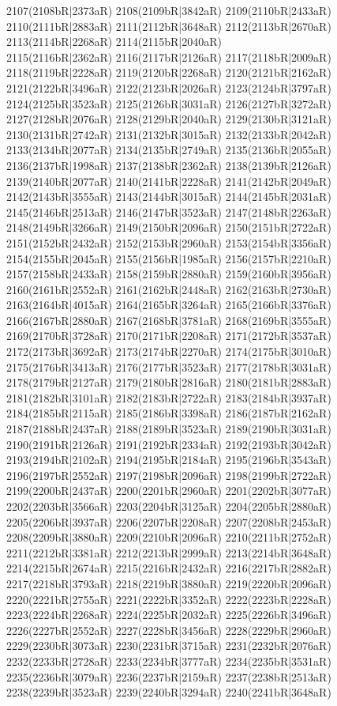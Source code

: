 2107(2108bR|2373aR) 2108(2109bR|3842aR) 2109(2110bR|2433aR) 2110(2111bR|2883aR) 2111(2112bR|3648aR) 2112(2113bR|2670aR) 2113(2114bR|2268aR) 2114(2115bR|2040aR) \\2115(2116bR|2362aR) 2116(2117bR|2126aR) 2117(2118bR|2009aR) 2118(2119bR|2228aR) 2119(2120bR|2268aR) 2120(2121bR|2162aR) 2121(2122bR|3496aR) 2122(2123bR|2026aR) 2123(2124bR|3797aR) \\2124(2125bR|3523aR) 2125(2126bR|3031aR) 2126(2127bR|3272aR) 2127(2128bR|2076aR) 2128(2129bR|2040aR) 2129(2130bR|3121aR) 2130(2131bR|2742aR) 2131(2132bR|3015aR) 2132(2133bR|2042aR) \\2133(2134bR|2077aR) 2134(2135bR|2749aR) 2135(2136bR|2055aR) 2136(2137bR|1998aR) 2137(2138bR|2362aR) 2138(2139bR|2126aR) 2139(2140bR|2077aR) 2140(2141bR|2228aR) 2141(2142bR|2049aR) \\2142(2143bR|3555aR) 2143(2144bR|3015aR) 2144(2145bR|2031aR) 2145(2146bR|2513aR) 2146(2147bR|3523aR) 2147(2148bR|2263aR) 2148(2149bR|3266aR) 2149(2150bR|2096aR) 2150(2151bR|2722aR) \\2151(2152bR|2432aR) 2152(2153bR|2960aR) 2153(2154bR|3356aR) 2154(2155bR|2045aR) 2155(2156bR|1985aR) 2156(2157bR|2210aR) 2157(2158bR|2433aR) 2158(2159bR|2880aR) 2159(2160bR|3956aR) \\2160(2161bR|2552aR) 2161(2162bR|2448aR) 2162(2163bR|2730aR) 2163(2164bR|4015aR) 2164(2165bR|3264aR) 2165(2166bR|3376aR) 2166(2167bR|2880aR) 2167(2168bR|3781aR) 2168(2169bR|3555aR) \\2169(2170bR|3728aR) 2170(2171bR|2208aR) 2171(2172bR|3537aR) 2172(2173bR|3692aR) 2173(2174bR|2270aR) 2174(2175bR|3010aR) 2175(2176bR|3413aR) 2176(2177bR|3523aR) 2177(2178bR|3031aR) \\2178(2179bR|2127aR) 2179(2180bR|2816aR) 2180(2181bR|2883aR) 2181(2182bR|3101aR) 2182(2183bR|2722aR) 2183(2184bR|3937aR) 2184(2185bR|2115aR) 2185(2186bR|3398aR) 2186(2187bR|2162aR) \\2187(2188bR|2437aR) 2188(2189bR|3523aR) 2189(2190bR|3031aR) 2190(2191bR|2126aR) 2191(2192bR|2334aR) 2192(2193bR|3042aR) 2193(2194bR|2102aR) 2194(2195bR|2184aR) 2195(2196bR|3543aR) \\2196(2197bR|2552aR) 2197(2198bR|2096aR) 2198(2199bR|2722aR) 2199(2200bR|2437aR) 2200(2201bR|2960aR) 2201(2202bR|3077aR) 2202(2203bR|3566aR) 2203(2204bR|3125aR) 2204(2205bR|2880aR) \\2205(2206bR|3937aR) 2206(2207bR|2208aR) 2207(2208bR|2453aR) 2208(2209bR|3880aR) 2209(2210bR|2096aR) 2210(2211bR|2752aR) 2211(2212bR|3381aR) 2212(2213bR|2999aR) 2213(2214bR|3648aR) \\2214(2215bR|2674aR) 2215(2216bR|2432aR) 2216(2217bR|2882aR) 2217(2218bR|3793aR) 2218(2219bR|3880aR) 2219(2220bR|2096aR) 2220(2221bR|2755aR) 2221(2222bR|3352aR) 2222(2223bR|2228aR) \\2223(2224bR|2268aR) 2224(2225bR|2032aR) 2225(2226bR|3496aR) 2226(2227bR|2552aR) 2227(2228bR|3456aR) 2228(2229bR|2960aR) 2229(2230bR|3073aR) 2230(2231bR|3715aR) 2231(2232bR|2076aR) \\2232(2233bR|2728aR) 2233(2234bR|3777aR) 2234(2235bR|3531aR) 2235(2236bR|3079aR) 2236(2237bR|2159aR) 2237(2238bR|2513aR) 2238(2239bR|3523aR) 2239(2240bR|3294aR) 2240(2241bR|3648aR) 